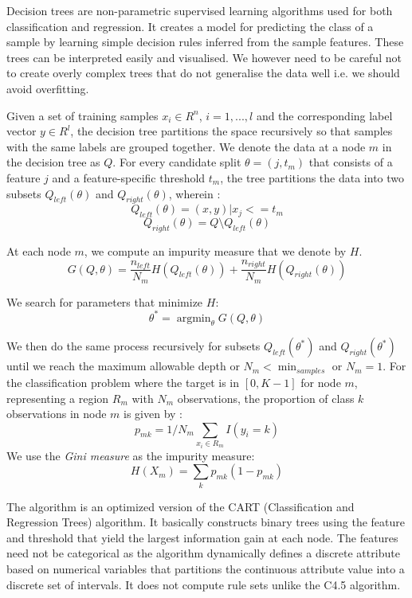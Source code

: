 Decision trees are non-parametric supervised learning algorithms used for
both classification and regression. 
It creates a model for predicting the class of a sample by learning
simple decision rules inferred from the sample features\citep{stats01}.
These trees can be interpreted easily and visualised.
We however need to be careful not to create overly complex trees 
that do not generalise the data well i.e. we should avoid overfitting. 

Given a set of training samples $x_i \in R^n$, $i=1,...,l$ and the
corresponding label vector $y \in R^l$, the decision tree partitions 
the space recursively so that samples with the same labels are grouped
together.
We denote the data at a node $m$ in the decision tree as $Q$. For
every candidate split $\theta = (j, t_m)$ that consists of a feature $j$ 
and a feature-specific threshold $t_m$, the tree partitions the data into
two subsets $Q_{left}(\theta)$ and $Q_{right}(\theta)$, wherein :
$$Q_{left}(\theta) = {(x, y) | x_j <= t_m}$$ 
$$Q_{right}(\theta) = Q \setminus Q_{left}(\theta)$$

At each node $m$, we compute an impurity measure that we denote by $H$.
$$G(Q,\theta) = \frac{n_{left}}{N_m} H(Q_{left}(\theta)) +
\frac{n_{right}}{N_m} H(Q_{right}(\theta))$$

We search for parameters that minimize $H$:
$$\theta^* = \operatorname{argmin}_\theta G(Q,\theta)$$

We then do the same process recursively for subsets $Q_{left}(\theta^*)$ and
$Q_{right}(\theta^*)$ until we reach the maximum allowable depth or $N_m
< \min_{samples}$ or $N_m = 1$.
For the classification problem where the target is in $[ 0, K-1]$
for node $m$, representing a region $R_m$ with $N_m$ observations, 
the proportion of class $k$ observations in node $m$ is given by :
$$p_{mk} = 1/ N_m \sum_{x_i \in R_m} I(y_i = k)$$
We use the \textit{Gini measure} as the impurity measure:
$$H(X_m) = \sum_k p_{mk} (1 - p_{mk})$$

The algorithm is an optimized version of the CART (Classification and Regression
Trees) algorithm\citep{cart84}.
It basically constructs binary trees using the feature and threshold that
yield the largest information gain at each node.
The features need not be categorical as the algorithm dynamically 
defines a discrete attribute based on numerical variables that 
partitions the continuous attribute value into a discrete set of intervals. 
It does not compute rule sets unlike the C4.5 algorithm\citep{quinlan93}.

